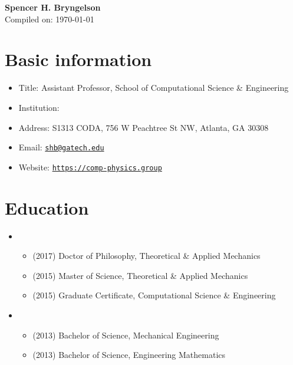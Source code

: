 



\usepackage[T1]{fontenc}
\usepackage{CormorantGaramond}




\begin{center}
    {\LARGE \bf Spencer H. Bryngelson} \\
    \medskip
    Compiled on: \today
\end{center}



\section{Basic information}
\begin{itemize}
    \item Title: Assistant Professor, School of Computational Science \& Engineering
    \item Institution: \GIT
    \item Address: S1313 CODA, 756 W Peachtree St NW, Atlanta, GA 30308
    \item Email: \href{mailto:shb@gatech.edu}{\texttt{shb@gatech.edu}}
    \item Website: \href{https://comp-physics.group}{\texttt{https://comp-physics.group}}
\end{itemize}

\section{Education}

\begin{itemize}
    \item \UIUC
    \begin{itemize}
        \item (2017) Doctor of Philosophy, Theoretical \& Applied Mechanics
        \item (2015) Master of Science, Theoretical \& Applied Mechanics
        \item (2015) Graduate Certificate, Computational Science \& Engineering
    \end{itemize}
    \item \UMD
    \begin{itemize}
        \item (2013) Bachelor of Science, Mechanical Engineering
        \item (2013) Bachelor of Science, Engineering Mathematics
    \end{itemize}
\end{itemize}


